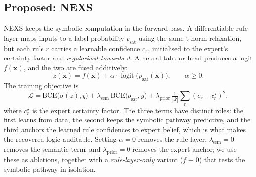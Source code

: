 \documentclass[11pt]{article}
\newcommand{\nexs}{\textsc{NEXS}}
\begin{document}
\subsection{Proposed: \nexs{}}
\label{sec:nexs}
\nexs{} keeps the symbolic computation in the forward pass. A differentiable rule
layer maps inputs to a label probability $p_{\mathrm{sat}}$ using the same t-norm
relaxation, but each rule $r$ carries a learnable confidence $c_r$, initialised to
the expert's certainty factor and \emph{regularised towards it}. A neural tabular
head produces a logit $f(\mathbf{x})$, and the two are fused additively:
\begin{equation}
z(\mathbf{x}) = f(\mathbf{x}) + \alpha \cdot \operatorname{logit}\!\big(p_{\mathrm{sat}}(\mathbf{x})\big),
\qquad \alpha \ge 0 .
\end{equation}
The training objective is
\begin{equation}
\mathcal{L} = \mathrm{BCE}\big(\sigma(z), y\big)
+ \lambda_{\mathrm{sem}}\,\mathrm{BCE}\big(p_{\mathrm{sat}}, y\big)
+ \lambda_{\mathrm{prior}}\,\tfrac{1}{|\mathcal{R}|}\textstyle\sum_r (c_r - c_r^{\star})^2 ,
\end{equation}
where $c_r^{\star}$ is the expert certainty factor. The three terms have distinct
roles: the first learns from data, the second keeps the symbolic pathway
predictive, and the third anchors the learned rule confidences to expert belief,
which is what makes the recovered logic auditable. Setting
$\alpha{=}0$ removes the rule layer, $\lambda_{\mathrm{sem}}{=}0$ removes the
semantic term, and $\lambda_{\mathrm{prior}}{=}0$ removes the expert anchor; we
use these as ablations, together with a \emph{rule-layer-only} variant
($f \equiv 0$) that tests the symbolic pathway in isolation.
\end{document}
